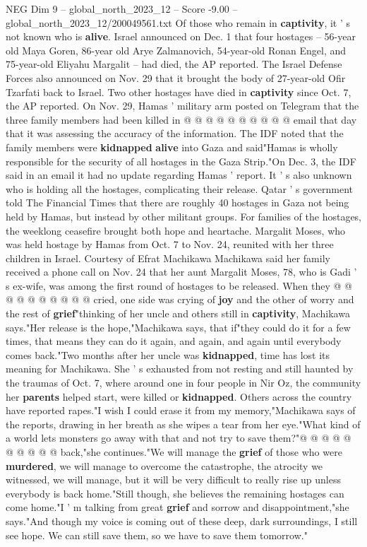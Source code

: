 \begin{textsample}{NEG Dim 9 – global\_north\_2023\_12 – Score -9.00 – global\_north\_2023\_12/200049561.txt}
Of those who remain in \textbf{captivity}, it ' s not known who is \textbf{alive}.
Israel announced on Dec. 1 that four hostages -- 56-year old Maya Goren, 86-year old Arye Zalmanovich, 54-year-old Ronan Engel, and 75-year-old Eliyahu Margalit -- had died, the AP reported.
The Israel Defense Forces also announced on Nov. 29 that it brought the body of 27-year-old Ofir Tzarfati back to Israel.
Two other hostages have died in \textbf{captivity} since Oct. 7, the AP reported.
On Nov. 29, Hamas ' military arm posted on Telegram that the three family members had been killed in @ @ @ @ @ @ @ @ @ @ email that day that it was assessing the accuracy of the information.
The IDF noted that the family members were \textbf{kidnapped} \textbf{alive} into Gaza and said"Hamas is wholly responsible for the security of all hostages in the Gaza Strip."On Dec. 3, the IDF said in an email it had no update regarding Hamas ' report.
It ' s also unknown who is holding all the hostages, complicating their release.
Qatar ' s government told The Financial Times that there are roughly 40 hostages in Gaza not being held by Hamas, but instead by other militant groups.
For families of the hostages, the weeklong ceasefire brought both hope and heartache.
Margalit Moses, who was held hostage by Hamas from Oct. 7 to Nov. 24, reunited with her three children in Israel.
Courtesy of Efrat Machikawa Machikawa said her family received a phone call on Nov. 24 that her aunt Margalit Moses, 78, who is Gadi ' s ex-wife, was among the first round of hostages to be released.
When they @ @ @ @ @ @ @ @ @ @ cried, one side was crying of \textbf{joy} and the other of worry and the rest of \textbf{grief}"thinking of her uncle and others still in \textbf{captivity}, Machikawa says."Her release is the hope,"Machikawa says, that if"they could do it for a few times, that means they can do it again, and again, and again until everybody comes back."Two months after her uncle was \textbf{kidnapped}, time has lost its meaning for Machikawa.
She ' s exhausted from not resting and still haunted by the traumas of Oct. 7, where around one in four people in Nir Oz, the community her \textbf{parents} helped start, were killed or \textbf{kidnapped}.
Others across the country have reported rapes."I wish I could erase it from my memory,"Machikawa says of the reports, drawing in her breath as she wipes a tear from her eye."What kind of a world lets monsters go away with that and not try to save them?"@ @ @ @ @ @ @ @ @ @ back,"she continues."We will manage the \textbf{grief} of those who were \textbf{murdered}, we will manage to overcome the catastrophe, the atrocity we witnessed, we will manage, but it will be very difficult to really rise up unless everybody is back home."Still though, she believes the remaining hostages can come home."I ' m talking from great \textbf{grief} and sorrow and disappointment,"she says."And though my voice is coming out of these deep, dark surroundings, I still see hope.
We can still save them, so we have to save them tomorrow."

\end{textsample}
